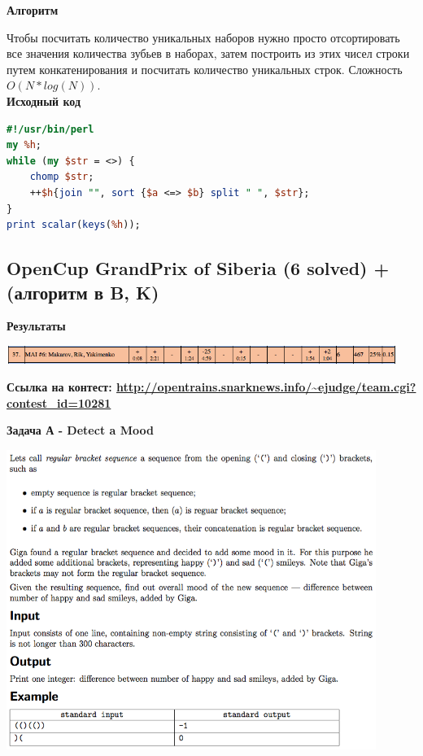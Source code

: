 \documentclass[a4paper,12pt]{article}
\begin{document}
\textbf{{\large Алгоритм}}

Чтобы посчитать количество уникальных наборов нужно просто отсортировать все значения количества зубьев в наборах, затем построить из этих чисел строки путем конкатенирования и посчитать количество уникальных строк. Сложность $O(N * log(N))$. \\

\textbf{{\large Исходный код}} \\
\begin{lstlisting}[language=Perl]
#!/usr/bin/perl
my %h;
while (my $str = <>) {
	chomp $str;
	++$h{join "", sort {$a <=> $b} split " ", $str};
}
print scalar(keys(%h));
\end{lstlisting}







%
%
\newpage
\subsection{OpenCup GrandPrix of Siberia (6 solved) + (алгоритм в B, K)}

\textbf{{\large Результаты}} \\
\begin{center}
\includegraphics[width=0.95\textwidth]{OC_Siberia/result.png}\\ [1cm]
\end{center}

\textbf{{\large Ссылка на контест: \url{http://opentrains.snarknews.info/~ejudge/team.cgi?contest_id=10281}}}

\newpage
\textbf{{\large Задача А - Detect a Mood}}

\begin{center}
\includegraphics[width=0.9\textwidth]{OC_Siberia/A.png}\\ [1cm]
\end{center}
\end{document}
